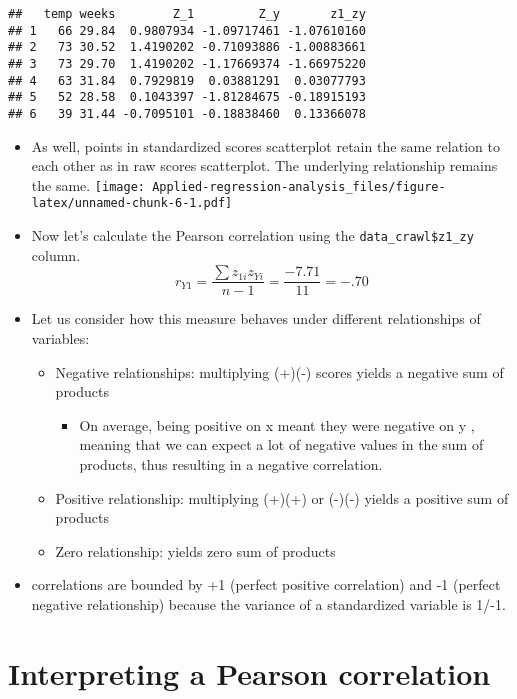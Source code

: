 \documentclass[
]{book}
\providecommand{\tightlist}{%
  \setlength{\itemsep}{0pt}\setlength{\parskip}{0pt}}
\begin{document}
\begin{verbatim}
##   temp weeks        Z_1         Z_y       z1_zy
## 1   66 29.84  0.9807934 -1.09717461 -1.07610160
## 2   73 30.52  1.4190202 -0.71093886 -1.00883661
## 3   73 29.70  1.4190202 -1.17669374 -1.66975220
## 4   63 31.84  0.7929819  0.03881291  0.03077793
## 5   52 28.58  0.1043397 -1.81284675 -0.18915193
## 6   39 31.44 -0.7095101 -0.18838460  0.13366078
\end{verbatim}

\begin{itemize}
\item
  As well, points in standardized scores scatterplot retain the same relation to each other as in raw scores scatterplot. The underlying relationship remains the same.
  \texttt{[image: Applied-regression-analysis\_files/figure-latex/unnamed-chunk-6-1.pdf]}
\item
  Now let's calculate the Pearson correlation using the \texttt{data\_crawl\$z1\_zy} column.
  \[
  r_{Y1} = \frac{\sum{z_{1i}z_{Yi}}}{n -1} = \frac{-7.71}{11} = -.70
  \]
\item
  Let us consider how this measure behaves under different relationships of variables:

  \begin{itemize}
  \tightlist
  \item
    Negative relationships: multiplying (+)(-) scores yields a negative sum of products

    \begin{itemize}
    \tightlist
    \item
      On average, being positive on x meant they were negative on y , meaning that we can expect a lot of negative values in the sum of products, thus resulting in a negative correlation.
    \end{itemize}
  \item
    Positive relationship: multiplying (+)(+) or (-)(-) yields a positive sum of products
  \item
    Zero relationship: yields zero sum of products
  \end{itemize}
\item
  correlations are bounded by +1 (perfect positive correlation) and -1 (perfect negative relationship) because the variance of a standardized variable is 1/-1.
\end{itemize}

\hypertarget{interpreting-a-pearson-correlation}{%
\section{Interpreting a Pearson correlation}\label{interpreting-a-pearson-correlation}}
\end{document}
